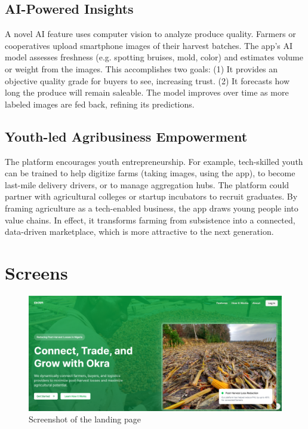 {\subsection{AI-Powered Insights}
A novel AI feature uses computer vision to analyze produce quality. Farmers or cooperatives upload smartphone images of their harvest batches. The app’s AI model assesses freshness (e.g. spotting bruises, mold, color) and estimates volume or weight from the images. This accomplishes two goals: (1) It provides an objective quality grade for buyers to see, increasing trust. (2) It forecasts how long the produce will remain saleable. The model improves over time as more labeled images are fed back, refining its predictions.

\subsection{Youth-led Agribusiness Empowerment}
The platform encourages youth entrepreneurship. For example, tech-skilled youth can be trained to help digitize farms (taking images, using the app), to become last-mile delivery drivers, or to manage aggregation hubs. The platform could partner with agricultural colleges or startup incubators to recruit graduates. By framing agriculture as a tech-enabled business, the app draws young people into value chains. In effect, it transforms farming from subsistence into a connected, data-driven marketplace, which is more attractive to the next generation.


\section{Screens}


\begin{figure}[H]
    \centering
    \includegraphics[scale=0.3]{Figures/okra_mockup_landing.png}
    \caption{Screenshot of the landing page}
    \label{fig:figure-05}
\end{figure}


}
